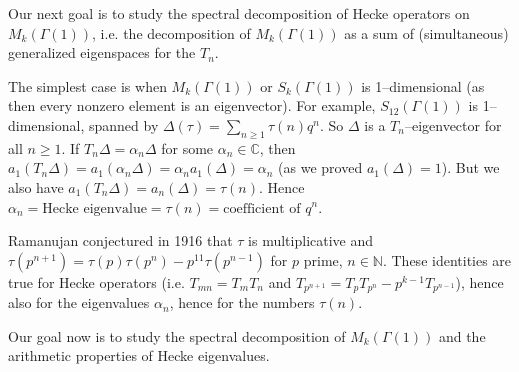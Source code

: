 \documentclass{article}
\theoremstyle{definition}
\begin{document}
Our next goal is to study the spectral decomposition of Hecke operators on $M_k(\Gamma(1))$, i.e. the decomposition of $M_k(\Gamma(1))$ as a sum of (simultaneous) generalized eigenspaces for the $T_n$.
\vspace{1mm}
 
The simplest case is when $M_k(\Gamma(1))$ or $S_k(\Gamma(1))$ is 1--dimensional (as then every nonzero element is an eigenvector). For example, $S_{12}(\Gamma(1))$ is 1--dimensional, spanned by $\Delta(\tau) = \sum_{n\ge 1}^{} \tau(n)q^n$. So $\Delta$ is a $T_n$--eigenvector for all $n\ge 1$. If $T_n \Delta = \alpha_n \Delta$ for some $\alpha_n \in \mathbb{C}$, then $a_1(T_n \Delta) = a_1(\alpha_n \Delta) = \alpha_n a_1(\Delta) = \alpha_n$ (as we proved $a_1(\Delta) = 1$). But we also have $a_1(T_n \Delta) = a_n(\Delta) = \tau(n)$. Hence $\alpha_n = \text{Hecke eigenvalue} = \tau(n) = \text{coefficient of }q^n$.
\vspace{1mm}
 
Ramanujan conjectured in 1916 that $\tau$ is multiplicative and $\tau(p^{n+1}) = \tau(p)\tau(p^{n}) - p^{11}\tau(p^{n-1})$ for $p$ prime, $n \in \mathbb{N}$. These identities are true for Hecke operators (i.e. $T_{mn}= T_m T_n$ and $T_{p^{n+1}} = T_p T_{p^n}-p^{k-1}T_{p^{n-1}}$), hence also for the eigenvalues $\alpha_n$, hence for the numbers $\tau(n)$.
\vspace{1mm}
 

Our goal now is to study the spectral decomposition of $M_k(\Gamma(1))$ and the arithmetic properties of Hecke eigenvalues.
 
\end{document}
